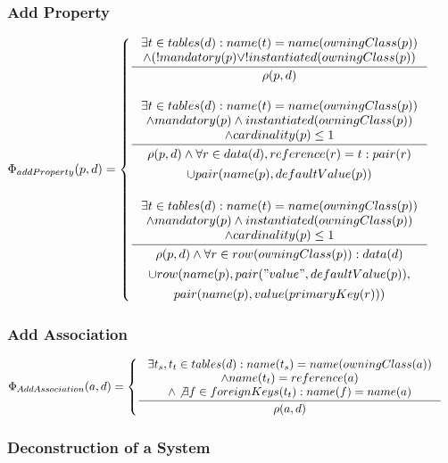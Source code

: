 \documentclass[11pt]{article}
\begin{document}
\subsubsection{Add Property}
$
\Phi_{addProperty}(p, d) = \begin{cases}
\inference{ \exists t \in tables(d) : name(t) = name(owningClass(p)) \\ \wedge (! mandatory(p) \vee ! instantiated(owningClass(p))}{ \rho(p,d)} 
\\ \\ 
\inference{ \exists t \in tables(d) : name(t) = name(owningClass(p)) \\ \wedge mandatory(p) \wedge instantiated(owningClass(p)) \\ \wedge cardinality(p) \leq 1}{\begin{gathered}
 \rho(p,d) \wedge \forall r \in data(d), reference(r) = t : pair(r) \\ \cup pair(name(p), defaultValue(p))
\end{gathered}
} 
\\ \\
\inference{ \exists t \in tables(d) : name(t) = name(owningClass(p)) \\ \wedge mandatory(p) \wedge instantiated(owningClass(p)) \\ \wedge cardinality(p) \leq 1}{\begin{gathered}
 \rho(p,d) \wedge \forall r \in row(owningClass(p)) : data(d)\\ \cup row(name(p), pair("value", defaultValue(p)), \\ pair(name(p), value(primaryKey(r))) 
\end{gathered}
} 

\end{cases}
$

\subsubsection{Add Association}
$
\Phi_{AddAssociation}(a, d) = \begin{cases}
\inference{ \exists t_s, t_t \in tables(d) : name(t_s) = name(owningClass(a)) \\ \wedge name(t_t) = reference(a) \\ \wedge \not \exists f \in foreignKeys(t_t) : name(f) = name(a) }{ \rho(a,d) }
 \end{cases}
$


\subsubsection{Deconstruction of a System}
\end{document}
